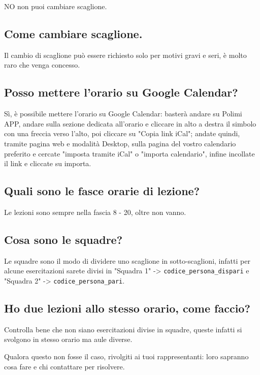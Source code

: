 \documentclass[legal]{polinetwork}
\begin{document}
NO non puoi cambiare scaglione.

\subsection{Come cambiare scaglione.}


Il cambio di scaglione può essere richiesto solo per motivi gravi e seri, è molto raro che venga concesso.

\subsection{Posso mettere l'orario su Google Calendar?}


Sì, è possibile mettere l'orario su Google Calendar: basterà andare su Polimi APP, andare sulla sezione dedicata all'orario e cliccare in alto a destra il simbolo con una freccia verso l'alto, poi cliccare su "Copia link iCal"; andate quindi, tramite pagina web e modalità Desktop, sulla pagina del vostro calendario preferito e cercate "imposta tramite iCal" o "importa calendario", infine incollate il link e cliccate su importa.


\subsection{Quali sono le fasce orarie di lezione?}


Le lezioni sono sempre nella fascia 8 - 20, oltre non vanno.

\subsection{Cosa sono le squadre?}


Le squadre sono il modo di dividere uno scaglione in sotto-scaglioni, infatti per alcune esercitazioni sarete divisi in "Squadra 1" -> \texttt{codice\_persona\_dispari} e "Squadra 2" -> \texttt{codice\_persona\_pari}.

\subsection{Ho due lezioni allo stesso orario, come faccio?}


Controlla bene che non siano esercitazioni divise in squadre, queste infatti si svolgono in stesso orario ma aule diverse.

Qualora questo non fosse il caso, rivolgiti ai tuoi rappresentanti: loro sapranno cosa fare e chi contattare per risolvere.
\end{document}
